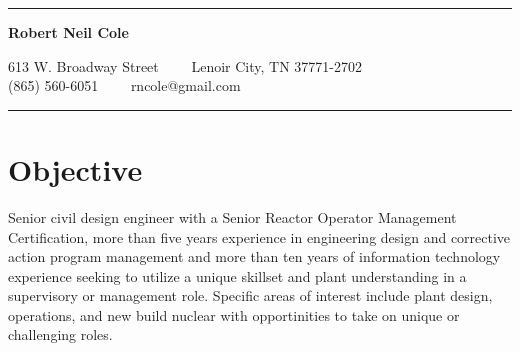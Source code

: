 \documentclass[11pt,letterpaper]{article}
\begin{document}
\chead{}
\rhead{\thepage}
\lfoot{}
\cfoot{}
\rfoot{}
\thispagestyle{empty}

\hrule
\begin{center}
{\LARGE \textbf{Robert Neil Cole}}

613 W. Broadway Street\ \ \textbullet
\ \ Lenoir City, TN 37771-2702
\\
\hspace{.35em}(865) 560-6051\ \ \textbullet
\ \ rncole@gmail.com
\end{center}
\hrule
\vspace{-0.4em}

\section*{Objective}
Senior civil design engineer with a Senior Reactor Operator Management Certification, more than five years experience in engineering design and corrective action program management and more than ten years of information technology experience seeking to utilize a unique skillset and plant understanding in a supervisory or management role.  Specific areas of interest include plant design, operations, and new build nuclear with opportinities to take on unique or challenging roles.
\end{document}
